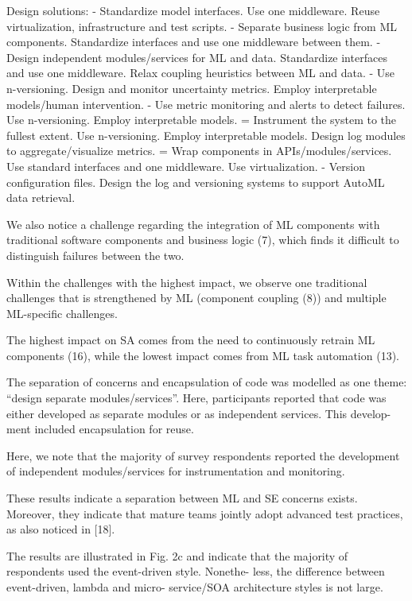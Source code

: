Design solutions:
- Standardize model interfaces. Use one middleware.
  Reuse virtualization, infrastructure and test scripts.
- Separate business logic from ML components. Standardize interfaces
  and use one middleware between them.
- Design independent modules/services for ML and data. Standardize
  interfaces and use one middleware. Relax coupling heuristics
  between ML and data.
- Use n-versioning. Design and monitor uncertainty metrics.
  Employ interpretable models/human intervention.
- Use metric monitoring and alerts to detect failures. Use n-versioning.
  Employ interpretable models.
= Instrument the system to the fullest extent. Use n-versioning. Employ
  interpretable models. Design log modules to aggregate/visualize metrics.
= Wrap components in APIs/modules/services. Use standard interfaces
  and one middleware. Use virtualization.
- Version configuration files. Design the log and versioning systems
  to support AutoML data retrieval.

We also notice a challenge regarding the integration of ML components with
traditional software components and business logic (7), which finds it
difficult to distinguish failures between the two.

Within the challenges with the highest impact, we observe one
traditional challenges that is strengthened by ML (component
coupling (8)) and multiple ML-specific challenges.

The highest impact on SA comes from the need to continuously
retrain ML components (16), while the lowest impact comes
from ML task automation (13).

The separation of concerns and encapsulation of code was
modelled as one theme: “design separate modules/services”.
Here, participants reported that code was either developed as
separate modules or as independent services. This develop-
ment included encapsulation for reuse.

Here, we note that the majority of survey respondents reported
the development of independent modules/services for instrumentation
and monitoring.

These results indicate a separation between ML and SE concerns exists.
Moreover, they indicate that mature teams jointly adopt advanced test
practices, as also noticed in [18].

The results are illustrated in Fig. 2c and indicate that the
majority of respondents used the event-driven style. Nonethe-
less, the difference between event-driven, lambda and micro-
service/SOA architecture styles is not large.

